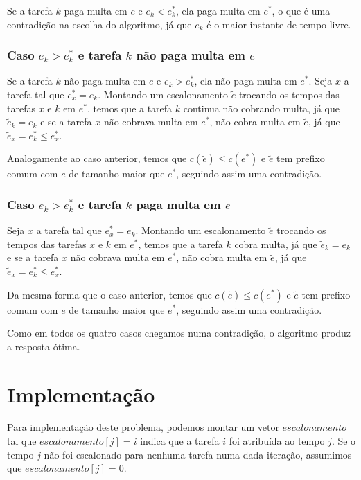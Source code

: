 Se a tarefa $k$ paga multa em $e$ e $e_k < e^*_k$, ela paga multa em $e^*$, o que é uma contradição na escolha do algoritmo, já que $e_k$ é o maior instante de tempo livre.

\subsubsection*{Caso $e_k > e^*_k$ e tarefa $k$ não paga multa em $e$}

Se a tarefa $k$ não paga multa em $e$ e $e_k > e^*_k$, ela não paga multa em $e^*$. Seja $x$ a tarefa tal que $e^*_x = e_k$. Montando um escalonamento $\widetilde{e}$ trocando os tempos das tarefas $x$ e $k$ em $e^*$, temos que a tarefa $k$ continua não cobrando multa, já que $\widetilde{e}_k = e_k$ e se a tarefa $x$ não cobrava multa em $e^*$, não cobra multa em $\widetilde{e}$, já que $\widetilde{e}_x = e^*_k \leq e^*_x$.

Analogamente ao caso anterior, temos que $c(\widetilde{e}) \leq c(e^*)$ e $\widetilde{e}$ tem prefixo comum com $e$ de tamanho maior que $e^*$, seguindo assim uma contradição.

\subsubsection*{Caso $e_k > e^*_k$ e tarefa $k$ paga multa em $e$}

Seja $x$ a tarefa tal que $e^*_x = e_k$. Montando um escalonamento $\widetilde{e}$ trocando os tempos das tarefas $x$ e $k$ em $e^*$, temos que a tarefa $k$ cobra multa, já que $\widetilde{e}_k = e_k$ e se a tarefa $x$ não cobrava multa em $e^*$, não cobra multa em $\widetilde{e}$, já que $\widetilde{e}_x = e^*_k \leq e^*_x$.

Da mesma forma que o caso anterior, temos que $c(\widetilde{e}) \leq c(e^*)$ e $\widetilde{e}$ tem prefixo comum com $e$ de tamanho maior que $e^*$, seguindo assim uma contradição.

Como em todos os quatro casos chegamos numa contradição, o algoritmo produz a resposta ótima.

\section{Implementação}

Para implementação deste problema, podemos montar um vetor $escalonamento$ tal que $escalonamento[j] = i$ indica que a tarefa $i$ foi atribuída ao tempo $j$. Se o tempo $j$ não foi escalonado para nenhuma tarefa numa dada iteração, assumimos que $escalonamento[j] = 0$.

